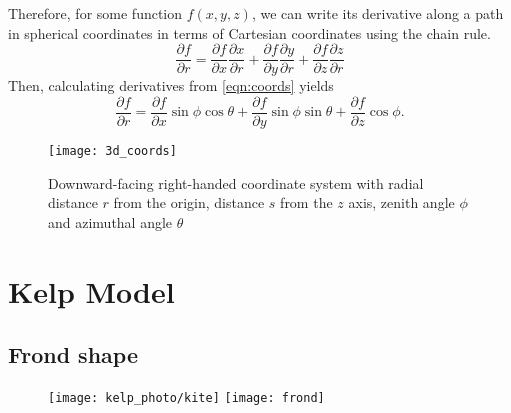 Therefore, for some function $f(x,y,z)$, we can write its derivative along a path in spherical coordinates in terms of Cartesian coordinates using the chain rule.
\begin{equation}
	\frac{\partial f}{\partial r} 
	=\frac{\partial f}{\partial x}\frac{\partial x}{\partial r} 
	+ \frac{\partial f}{\partial y}\frac{\partial y}{\partial r} 
	+ \frac{\partial f}{\partial z}\frac{\partial z}{\partial r}
\end{equation}
Then, calculating derivatives from \eqref{eqn:coords} yields
\begin{equation}
	\frac{\partial f}{\partial r} 
	=\frac{\partial f}{\partial x}\sin\phi\cos\theta
	+ \frac{\partial f}{\partial y}\sin\phi\sin\theta
	+ \frac{\partial f}{\partial z}\cos\phi.
	\label{eqn:partials}
\end{equation}
\begin{figure}[H]
	\centering
	\texttt{[image: 3d\_coords]}
	\caption{Downward-facing right-handed coordinate system with radial distance $r$ from the origin, distance $s$ from the $z$ axis, zenith angle $\phi$ and azimuthal angle $\theta$}
	\label{fig:3dcoords}
\end{figure}


\section{Kelp Model}

\subsection{Frond shape}
\label{sec:shape}


\begin{figure}[h]
	\centering
  \texttt{[image: kelp\_photo/kite]}
  \qquad
	\texttt{[image: frond]}
	\label{fig:frond}
\end{figure}

